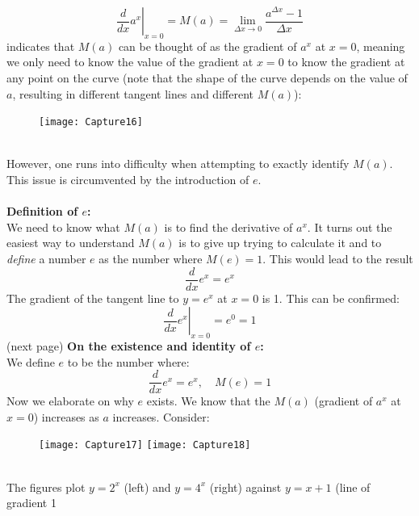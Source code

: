 \documentclass{report}
\begin{document}
\begin{equation*}
\left.\frac{d}{dx}a^x\right|_{x=0}=M(a)=\lim_{\Delta x\to0}\frac{a^{\Delta x}-1}{\Delta x}
\end{equation*}
indicates that $M(a)$ can be thought of as the gradient of $a^x$ at $x=0$, meaning we only
need to know the value of the gradient at $x=0$ to know the gradient at any point on the curve
(note that the shape of the curve depends on the value of $a$, resulting in different
tangent lines and different $M(a)$): 
\begin{figure}[h]
\texttt{[image: Capture16]}\\
\centering
{}
\end{figure}\\
However, one runs into difficulty when attempting to exactly identify $M(a)$. This issue is
circumvented by the introduction of $e$.\\
\vspace{1mm}\\
\textbf{Definition of $e$:}\\
We need to know what $M(a)$ is to find the derivative of $a^x$. It turns out the easiest way to 
understand $M(a)$ is to give up trying to calculate it and to \textit{define} a number 
$e$ as the number where $M(e)=1$. This would lead to the result
\begin{equation*}
\frac{d}{dx}e^x=e^x
\end{equation*}
The gradient of the tangent line to $y=e^x$ at $x=0$ is 1. This can be confirmed:
\begin{equation*}
\left.\frac{d}{dx}e^x\right|_{x=0}=e^0=1
\end{equation*}
(next page)
\newpage
\noindent\textbf{On the existence and identity of $e$:}\\
We define $e$ to be the number where:
\begin{equation*}
\frac{d}{dx}e^x=e^x,\quad M(e)=1
\end{equation*}
Now we elaborate on why $e$ exists. We know that the $M(a)$ (gradient of $a^x$ at $x=0$) 
increases as $a$ increases. Consider:
\begin{figure}[h]
\texttt{[image: Capture17]}
\texttt{[image: Capture18]}
\centering
{}\\
\end{figure}\\
The figures plot $y=2^x$ (left) and $y=4^x$ (right) against $y=x+1$ (line of gradient 1 
\end{document}
